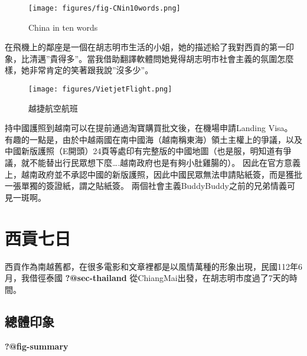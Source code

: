 \documentclass[
  a4paper,
]{ctexart}
\begin{document}
\begin{figure}

{\centering \texttt{[image: figures/fig-CNin10words.png]}

}

\caption{\label{fig-CNin10words}China in ten words}

\end{figure}

在飛機上的鄰座是一個在胡志明市生活的小姐，她的描述給了我對西貢的第一印象，比清邁''貴得多''。當我借助翻譯軟體問她覺得胡志明市社會主義的氛圍怎麼樣，她非常肯定的笑著跟我說''沒多少''。

\begin{figure}

{\centering \texttt{[image: figures/VietjetFlight.png]}

}

\caption{越捷航空航班}

\end{figure}

持中國護照到越南可以在提前通過淘寶購買批文後，在機場申請Landing Visa。
有趣的一點是，由於中越兩國在南中國海（越南稱東海）領土主權上的爭議，以及中國新版護照（E開頭）24頁等處印有完整版的中國地圖（也是服，明知道有爭議，就不能替出行民眾想下麼\ldots.越南政府也是有夠小肚雞腸的）。
因此在官方意義上，越南政府並不承認中國的新版護照，因此中國民眾無法申請貼紙簽，而是獲批一張單獨的簽證紙，謂之貼紙簽。
兩個社會主義BuddyBuddy之前的兄弟情義可見一斑啊。


\hypertarget{ux897fux8ca2ux4e03ux65e5-1}{%
\chapter{西貢七日}\label{ux897fux8ca2ux4e03ux65e5-1}}

西貢作為南越舊都，在很多電影和文章裡都是以風情萬種的形象出現，民國112年6月，我借徑泰國
\textbf{?@sec-thailand} 從ChiangMai出發，在胡志明市度過了7天的時間。

\hypertarget{ux7e3dux9ad4ux5370ux8c61-2}{%
\section{總體印象}\label{ux7e3dux9ad4ux5370ux8c61-2}}

\textbf{?@fig-summary}
\end{document}
